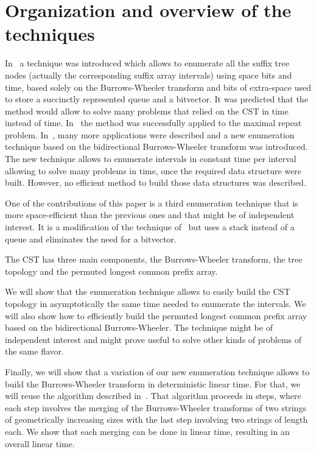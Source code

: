 \documentclass[a4paper]{article}
\begin{document}
\section{Organization and overview of the techniques}
In~\cite{BGOS11,BGOS13} a technique was introduced which allows to enumerate 
all the suffix tree nodes (actually the corresponding suffix array intervals) 
using space  bits and  time,
based solely on the Burrows-Wheeler transform and  bits of extra-space 
used to store a succinctly represented queue and a bitvector. 
It was predicted that the method would allow to solve many problems 
that relied on the \textsc{CST} in  time instead of 
time. In~\cite{BBO12} the method was successfully applied to the maximal repeat problem. 
In~\cite{BCKM13}, many more applications were described and 
a new enumeration technique based on the bidirectional Burrows-Wheeler transform
was introduced. 
The new technique allows to enumerate intervals in constant time per interval allowing to solve 
many problems in  time, once the required data structure were built. 
However, no efficient method to build those data structures was described. 

One of the contributions of this paper is a third enumeration technique that is more 
space-efficient than the 
previous ones and that might be of independent interest. 
It is a modification of the technique of~\cite{BGOS13} 
but uses a stack instead of a queue and eliminates the need for
a bitvector. 

The \textsc{CST} has three main components, the Burrows-Wheeler 
transform, the tree topology and the permuted longest common prefix 
array. 

We will show that the enumeration 
technique allows to easily build the \textsc{CST} topology in asymptotically 
the same time needed to enumerate the intervals. 
We will also show how to efficiently build the permuted longest common prefix array 
based on the bidirectional Burrows-Wheeler. The technique might be of independent 
interest and might prove useful to solve other kinds of problems of the same flavor. 

Finally, we will show that a variation of our new enumeration technique 
allows to build the Burrows-Wheeler transform in deterministic linear time. 
For that, we will reuse the algorithm described in~\cite{HSS09}. 
That algorithm proceeds in  steps, where each step 
involves the merging of the Burrows-Wheeler transforms of two strings 
of geometrically increasing sizes with the last step involving 
two strings of length  each. 
We show that each merging can be done in linear time, resulting in an 
overall linear time. 
\end{document}
